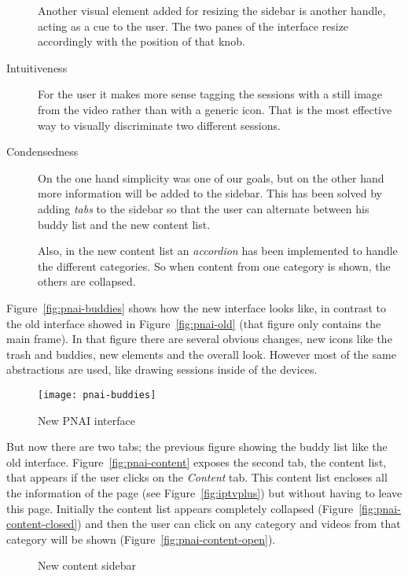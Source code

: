 \begin{description}
  Another visual element added for resizing the sidebar is another handle, acting as a cue to the user.
  The two panes of the interface resize accordingly with the position of that knob.
  \item[Intuitiveness] For the user it makes more sense tagging the sessions with a still image from the video rather than with a generic icon.
  That is the most effective way to visually discriminate two different sessions.
  \item[Condensedness] On the one hand simplicity was one of our goals, but on the other hand more information will be added to the sidebar.
  This has been solved by adding \emph{tabs} to the sidebar so that the user can alternate between his buddy list and the new content list.
  
  Also, in the new content list an \emph{accordion} has been implemented to handle the different categories.
  So when content from one category is shown, the others are collapsed.
\end{description}

Figure~\vref{fig:pnai-buddies} shows how the new interface looks like, in contrast to the old interface showed in Figure~\vref{fig:pnai-old} (that figure only contains the main frame).
In that figure there are several obvious changes, new icons like the trash and buddies, new elements and the overall look.
However most of the same abstractions are used, like drawing sessions inside of the devices.

\begin{figure}[htbp]
  \centering
    \texttt{[image: pnai-buddies]}
  \caption{New PNAI interface}
  \label{fig:pnai-buddies}
\end{figure}

But now there are two tabs; the previous figure showing the buddy list like the old interface.
Figure~\vref{fig:pnai-content} exposes the second tab, the content list, that appears if the user clicks on the \emph{Content} tab.
This content list encloses all the information of the  page (see Figure~\vref{fig:iptvplus}) but without having to leave this page.
Initially the content list appears completely collapsed (Figure~\vref{fig:pnai-content-closed}) and then the user can click on any category and videos from that category will be shown (Figure~\vref{fig:pnai-content-open}).

\begin{figure}[htbp]
  \centering
  \caption{New content sidebar}
  \label{fig:pnai-content}
\end{figure}

